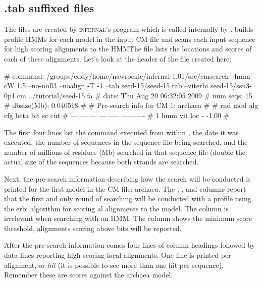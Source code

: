 \subsection{.tab suffixed files}

The  files are created by \textsc{infernal}'s
 program which is called internally by
.  builds profile HMMs for each model
in the input CM file and scans each input sequence for high scoring
alignments to the HMM\. The  file lists the locations and
scores of each of these alignments. Let's look at the header of the 
 file created here:

\begin{sreoutput}
# command:    /groups/eddy/home/nawrockie/infernal-1.01/src/cmsearch --hmm-cW 1.5 --no-null3 
--noalign -T -1 --tab seed-15/seed-15.tab --viterbi seed-15/ssu3-0p1.cm ../tutorial/seed-15.fa
# date:       Thu Aug 20 06:32:05 2009
# num seqs:   15
# dbsize(Mb): 0.040518
#
# Pre-search info for CM 1: archaea
#
# rnd  mod  alg  cfg   beta  bit sc cut
# ---  ---  ---  ---  -----  ----------
#   1  hmm  vit  loc      -       -1.00
#
\end{sreoutput}

The first four lines list the  command executed from
within , the date it was executed, the number of
sequences in the sequence file being searched, and the number of
millions of residues (Mb) searched in that sequence file (double the
actual size of the sequences because both strands are searched.

Next, the pre-search information describing how the search will be
conducted is printed for the first model in the CM file: archaea. 
The , ,  and  columns report
that the first and only round of searching will be conducted with a
profile  using the erbi algorithm for scoring
al alignments to the model. The 
column is irrelevant when searching with an HMM. The 
column shows the minimum score threshold, alignments scoring above
 bits will be reported.

After the pre-search information comes four lines of column headings
followed by data lines reporting high scoring local alignments. One
line is printed per alignment, or \emph{hit} (it is possible to see
more than one hit per sequence). Remember these are scores against the
archaea model.

